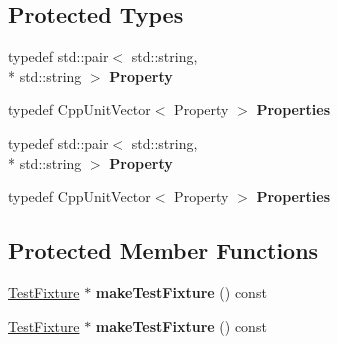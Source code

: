 \subsection*{Protected Types}
\begin{DoxyCompactItemize}
\item 
\hypertarget{class_test_suite_builder_context_base_a1e2319a53ecd7a718c87f4ea5c42d4c6}{typedef std\+::pair$<$ std\+::string, \\*
std\+::string $>$ {\bfseries Property}}\label{class_test_suite_builder_context_base_a1e2319a53ecd7a718c87f4ea5c42d4c6}

\item 
\hypertarget{class_test_suite_builder_context_base_a95565394a60a8b8d843a5a64d2572a86}{typedef Cpp\+Unit\+Vector$<$ Property $>$ {\bfseries Properties}}\label{class_test_suite_builder_context_base_a95565394a60a8b8d843a5a64d2572a86}

\item 
\hypertarget{class_test_suite_builder_context_base_a1e2319a53ecd7a718c87f4ea5c42d4c6}{typedef std\+::pair$<$ std\+::string, \\*
std\+::string $>$ {\bfseries Property}}\label{class_test_suite_builder_context_base_a1e2319a53ecd7a718c87f4ea5c42d4c6}

\item 
\hypertarget{class_test_suite_builder_context_base_a95565394a60a8b8d843a5a64d2572a86}{typedef Cpp\+Unit\+Vector$<$ Property $>$ {\bfseries Properties}}\label{class_test_suite_builder_context_base_a95565394a60a8b8d843a5a64d2572a86}

\end{DoxyCompactItemize}
\subsection*{Protected Member Functions}
\begin{DoxyCompactItemize}
\item 
\hypertarget{class_test_suite_builder_context_base_abad08dcb491370e1ec428d1162cf4199}{\hyperlink{class_test_fixture}{Test\+Fixture} $\ast$ {\bfseries make\+Test\+Fixture} () const }\label{class_test_suite_builder_context_base_abad08dcb491370e1ec428d1162cf4199}

\item 
\hypertarget{class_test_suite_builder_context_base_a5474060095c1ab76f16a133af0fb3b52}{\hyperlink{class_test_fixture}{Test\+Fixture} $\ast$ {\bfseries make\+Test\+Fixture} () const }\label{class_test_suite_builder_context_base_a5474060095c1ab76f16a133af0fb3b52}

\end{DoxyCompactItemize}

